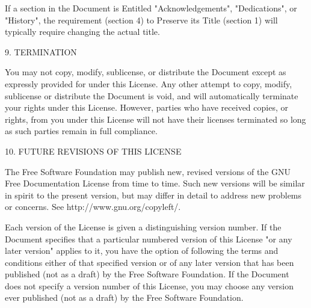 \documentclass[letterpaper]{book}
\begin{document}
If a section in the Document is Entitled "Acknowledgements",
"Dedications", or "History", the requirement (section 4) to Preserve
its Title (section 1) will typically require changing the actual
title.

9. TERMINATION

You may not copy, modify, sublicense, or distribute the Document
except as expressly provided for under this License. Any other attempt
to copy, modify, sublicense or distribute the Document is void, and
will automatically terminate your rights under this License. However,
parties who have received copies, or rights, from you under this
License will not have their licenses terminated so long as such
parties remain in full compliance.

10. FUTURE REVISIONS OF THIS LICENSE

The Free Software Foundation may publish new, revised versions of the
GNU Free Documentation License from time to time. Such new versions
will be similar in spirit to the present version, but may differ in
detail to address new problems or concerns. See
http://www.gnu.org/copyleft/.

Each version of the License is given a distinguishing version
number. If the Document specifies that a particular numbered version
of this License "or any later version" applies to it, you have the
option of following the terms and conditions either of that specified
version or of any later version that has been published (not as a
draft) by the Free Software Foundation. If the Document does not
specify a version number of this License, you may choose any version
ever published (not as a draft) by the Free Software Foundation.
\end{document}
